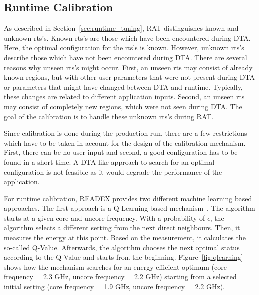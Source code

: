\subsection{Runtime Calibration} \label{sec:calibration}

As described in Section~\ref{sec:runtime_tuning}, RAT distinguishes known and unknown rts's. 
Known rts's are those which have been encountered during DTA. Here, the optimal configuration for the rts's is known. However, unknown rts's describe those which have not been encountered during DTA. There are several reasons why unseen rts's might occur. First, an unseen rts may consist of already known regions, but with other user parameters that were not present during DTA or parameters that might have changed between DTA and runtime. Typically, these changes are related to different application inputs. Second, an unseen rts may consist of completely new regions, which were not seen during DTA. The goal of the calibration is to handle these unknown rts's during RAT.

Since calibration is done during the production run, there are a few restrictions which have to be taken in account for the design of the calibration mechanism. First, there can be no user input and second, a good configuration has to be found in a short time. A DTA-like approach to search for an optimal configuration is not feasible as it would degrade the performance of the application.

For runtime calibration, READEX provides two different machine learning based approaches. The first approach is a Q-Learning based mechanism~\cite{Gocht2019a}. The algorithm starts at a given core and uncore frequency. With a probability of {$\epsilon$}, the algorithm selects a different setting from the next direct neighbours. Then, it measures the energy at this point. Based on the measurement, it calculates the so-called Q-Value. Afterwards, the algorithm chooses the next optimal status according to the Q-Value and starts from the beginning. Figure~\ref{fig:qlearning} shows how the mechanism searches for an energy efficient optimum (core frequency = 2.3 GHz, uncore frequency = 2.2 GHz) starting from a selected initial setting (core frequency = 1.9 GHz, uncore frequency = 2.2 GHz).

